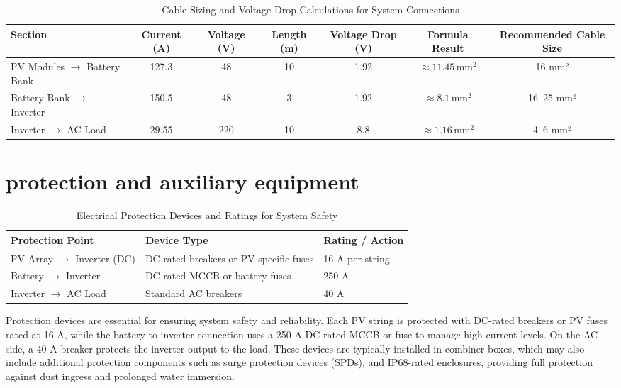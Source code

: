 \documentclass{article}
\begin{document}
\begin{table}[H]
    \small %
    \centering
    \begin{tabularx}{\textwidth}{|X|c|c|c|c|c|c|}
    \hline
    Section & Current (A) & Voltage (V) & Length (m) & Voltage Drop (V) & Formula Result & Recommended Cable Size \\
    \hline
    PV Modules $\to$ Battery Bank   & 127.3  & 48   & 10  & 1.92 & $\approx 11.45\, \text{mm}^2$ & 16 mm² \\
    \hline
    Battery Bank $\to$ Inverter     & 150.5  & 48   & 3   & 1.92 & $\approx 8.1\, \text{mm}^2$   & 16--25 mm² \\
    \hline
    Inverter $\to$ AC Load          & 29.55  & 220  & 10  & 8.8  & $\approx 1.16\, \text{mm}^2$  & 4--6 mm² \\
    \hline
    \end{tabularx}
\caption{Cable Sizing and Voltage Drop Calculations for System Connections}
\label{tab:voltage_drop}
\end{table}
\section{protection and auxiliary equipment}
\begin{table}[H]
    \small
    \centering
    \begin{tabularx}{\textwidth}{|X|X|X|}
    \hline
    Protection Point & Device Type & Rating / Action \\
    \hline
    PV Array $\to$ Inverter (DC) & DC-rated breakers or PV-specific fuses & 16 A per string \\
    \hline
    Battery $\to$ Inverter & DC-rated MCCB or battery fuses & 250 A \\
    \hline
    Inverter $\to$ AC Load & Standard AC breakers & 40 A \\
    \hline
    \end{tabularx}
    \caption{Electrical Protection Devices and Ratings for System Safety}
    \label{tab:protection_devices}
\end{table}
Protection devices are essential for ensuring system safety and reliability. Each PV string is protected with DC-rated breakers or PV fuses rated at 16 A, while the battery-to-inverter connection uses a 250 A DC-rated MCCB or fuse to manage high current levels. On the AC side, a 40 A breaker protects the inverter output to the load. These devices are typically installed in combiner boxes, which may also include additional protection components such as surge protection devices (SPDs), and IP68-rated enclosures, providing full protection against dust ingress and prolonged water immersion.
\end{document}
